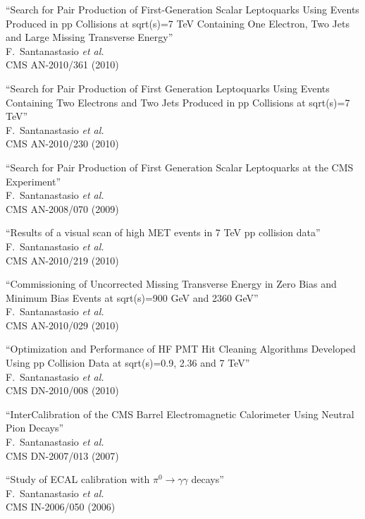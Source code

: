 \documentclass[10pt, a4paper]{article}
\begin{document}
\begin{thebibliography}{599}
``Search for Pair Production of First-Generation Scalar Leptoquarks Using Events Produced in pp Collisions at sqrt(s)=7 TeV Containing One Electron, Two Jets and Large Missing Transverse Energy''
  \\{}F.~Santanastasio {\it et al.}
  \\{}CMS AN-2010/361 (2010)

``Search for Pair Production of First Generation Leptoquarks Using Events Containing Two Electrons and Two Jets Produced in pp Collisions at sqrt(s)=7 TeV''
  \\{}F.~Santanastasio {\it et al.}
  \\{}CMS AN-2010/230 (2010)

``Search for Pair Production of First Generation Scalar Leptoquarks at the CMS Experiment''
  \\{}F.~Santanastasio {\it et al.}
  \\{}CMS AN-2008/070 (2009)

``Results of a visual scan of high MET events in 7 TeV pp collision data''
  \\{}F.~Santanastasio {\it et al.}
  \\{}CMS AN-2010/219 (2010)
  
``Commissioning of Uncorrected Missing Transverse Energy in Zero Bias and Minimum Bias Events at  sqrt(s)=900 GeV and  2360 GeV''
  \\{}F.~Santanastasio {\it et al.}
  \\{}CMS AN-2010/029 (2010)

``Optimization and Performance of HF PMT Hit Cleaning Algorithms Developed Using pp Collision Data at sqrt(s)=0.9, 2.36 and 7 TeV''
  \\{}F.~Santanastasio {\it et al.}
  \\{}CMS DN-2010/008 (2010)

``InterCalibration of the CMS Barrel Electromagnetic Calorimeter Using Neutral Pion Decays''
   \\{}F.~Santanastasio {\it et al.}
  \\{}CMS DN-2007/013 (2007)

``Study of ECAL calibration with $\pi^0 \rightarrow \gamma \gamma$ decays''
\\{}F.~Santanastasio {\it et al.}
\\{}CMS IN-2006/050 (2006)


\end{thebibliography}
\end{document}
